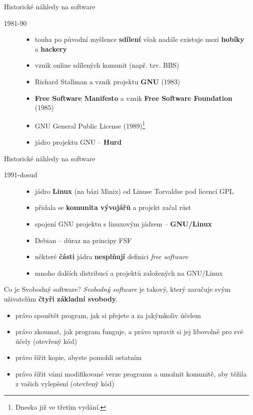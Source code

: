 \documentclass[11pt]{beamer}
\begin{document}
	\begin{frame}{Historické náhledy na software}
	\begin{description}
		\item[1981-90]
		\begin{itemize}
			\item touha po původní myšlence \textbf{sdílení} však nadále existuje mezi \textbf{hobíky} a \textbf{hackery}
			\item vznik online sdílených komunit (např. tzv. BBS)
			\item Richard Stallman a vznik projektu \textbf{GNU} (1983)
			\item \textbf{Free Software Manifesto} a vznik \textbf{Free Software Foundation} (1985)
			\item GNU General Public License (1989)\footnote{Dneska již ve třetím vydání.}
			\item jádro projektu GNU -- \textbf{Hurd}
		\end{itemize}
	\end{description}
\end{frame}

	\begin{frame}{Historické náhledy na software}
	\begin{description}
		\item[1991-dosud]
		\begin{itemize}
			\item jádro \textbf{Linux} (na bázi Minix) od Linuse Torvaldse pod licencí GPL
			\item přidala se \textbf{komunita vývojářů} a projekt začal růst
			\item spojení GNU projektu s linuxovým jádrem -- \textbf{GNU/Linux}
			\item Debian -- důraz na principy FSF
			\item některé \textbf{části} jádra \textbf{nesplňují} definici \textit{free software}
			\item mnoho dalších distribucí a projektů založených na GNU/Linux
		\end{itemize}
	\end{description}
\end{frame}
	
	
	\begin{frame}{Co je Svobodný software?}
		\textit{Svobodný software} je takový, který zaručuje svým uživatelům \textbf{čtyři základní svobody}.
				\begin{itemize}
			\item právo spouštět program, jak si přejete a za jakýmkoliv účelem
			\item právo zkoumat, jak program funguje, a právo upravit si jej libovolně pro své účely (otevřený kód)
			\item právo šířit kopie, abyste pomohli ostatním
			\item právo šířit vámi modifikované verze programu a umožnit komunitě, aby těžila z vašich vylepšení (otevřený kód)
		\end{itemize}
	\end{frame}
\end{document}
